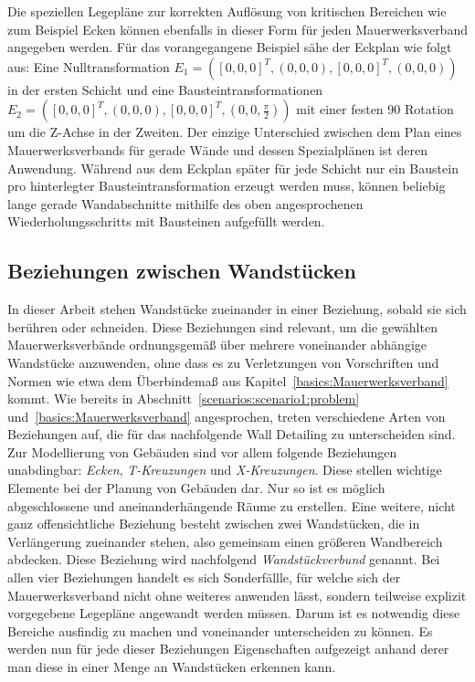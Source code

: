 Die speziellen Legepläne zur korrekten Auflösung von kritischen Bereichen wie zum Beispiel Ecken können ebenfalls in dieser Form für jeden Mauerwerksverband angegeben werden.
Für das vorangegangene Beispiel sähe der Eckplan wie folgt aus:
Eine Nulltransformation \(E_1 = ({[0, 0, 0]}^T, (0, 0, 0), {[0, 0, 0]}^T, (0, 0, 0))\) in der ersten Schicht und eine Bausteintransformationen 
\(E_2 = ({[0, 0, 0]}^T, (0, 0, 0), {[0, 0, 0]}^T, (0, 0, \frac{\pi}{2}))\) mit einer festen 90\degree{} Rotation um die Z-Achse in der Zweiten.
Der einzige Unterschied zwischen dem Plan eines Mauerwerksverbands für gerade Wände und dessen Spezialplänen ist deren Anwendung.
Während aus dem Eckplan später für jede Schicht nur ein Baustein pro hinterlegter Bausteintransformation erzeugt werden muss, können beliebig lange gerade Wandabschnitte mithilfe des oben angesprochenen Wiederholungsschritts mit Bausteinen aufgefüllt werden.

\subsection{Beziehungen zwischen Wandstücken}\label{concept:relations_wandtuecke}
In dieser Arbeit stehen Wandstücke zueinander in einer Beziehung, sobald sie sich berühren oder schneiden.
Diese Beziehungen sind relevant, um die gewählten Mauerwerksverbände ordnungsgemäß über mehrere voneinander abhängige Wandstücke anzuwenden, ohne dass es zu Verletzungen von Vorschriften und Normen wie etwa dem Überbindemaß aus Kapitel~\ref{basics:Mauerwerksverband} kommt.
Wie bereits in Abschnitt~\ref{scenarios:scenario1:problem} und~\ref{basics:Mauerwerksverband} angesprochen, treten verschiedene Arten von Beziehungen auf, die für das nachfolgende \glqq{}Wall Detailing\grqq{} zu unterscheiden sind.
Zur Modellierung von Gebäuden sind vor allem folgende Beziehungen unabdingbar:
\textit{Ecken}, \textit{T-Kreuzungen} und \textit{X-Kreuzungen}.
Diese stellen wichtige Elemente bei der Planung von Gebäuden dar. 
Nur so ist es möglich abgeschlossene und aneinanderhängende Räume zu erstellen.
Eine weitere, nicht ganz offensichtliche Beziehung besteht zwischen zwei Wandstücken, die in Verlängerung zueinander stehen, also gemeinsam einen größeren Wandbereich abdecken.
Diese Beziehung wird nachfolgend \textit{Wandstückverbund} genannt.
Bei allen vier Beziehungen handelt es sich Sonderfällle, für welche sich der Mauerwerksverband nicht ohne weiteres anwenden lässt, sondern teilweise explizit vorgegebene Legepläne angewandt werden müssen.
Darum ist es notwendig diese Bereiche ausfindig zu machen und voneinander unterscheiden zu können.
Es werden nun für jede dieser Beziehungen Eigenschaften aufgezeigt anhand derer man diese in einer Menge an Wandstücken erkennen kann.


